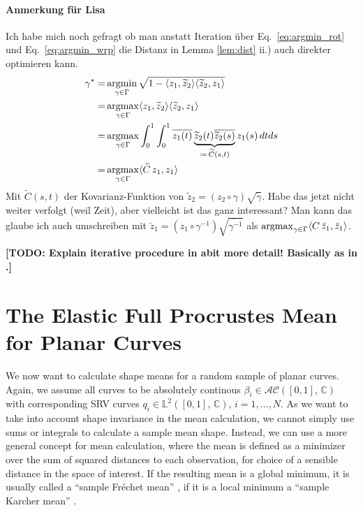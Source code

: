 \paragraph{Anmerkung für Lisa}
Ich habe mich noch gefragt ob man anstatt Iteration über Eq.\ \ref{eq:argmin_rot} und Eq.\ \ref{eq:argmin_wrp} die Distanz in Lemma \ref{lem:dist} ii.) auch direkter optimieren kann.
\begin{align*}
  \gamma^* = & \operatorname*{argmin}_{\gamma \in \Gamma} \sqrt{1 - \langle z_1, \widetilde z_2 \rangle \langle \widetilde z_2, z_1 \rangle } \\
    = & \operatorname*{argmax}_{\gamma \in \Gamma} \langle z_1, \widetilde z_2 \rangle \langle \widetilde z_2, z_1 \rangle \\
    = & \operatorname*{argmax}_{\gamma \in \Gamma} \int_0^1 \int_0^1
    \overline{z_1(t)} \underbrace{\widetilde z_2(t) \overline{\widetilde z_2(s)}}_{\coloneqq \, {\widetilde C}(s,t)} z_1(s) \, dt ds \\
    = & \operatorname*{argmax}_{\gamma \in \Gamma} \langle \widetilde C \, z_1, z_1 \rangle
\end{align*}
Mit $\widetilde C(s,t)$ der Kovarianz-Funktion von $\widetilde z_2 = (z_2 \circ \gamma) \sqrt{\dot\gamma}$.
Habe das jetzt nicht weiter verfolgt (weil Zeit), aber vielleicht ist das ganz interessant?
Man kann das glaube ich auch umschreiben mit $\breve z_1 = (z_1 \circ \gamma^{-1}) \sqrt{\dot{\gamma^{-1}}}$ als $\operatorname*{argmax}_{\gamma \in \Gamma} \langle C \, \breve z_1, \breve z_1 \rangle$.

\textbf{[TODO: Explain iterative procedure in abit more detail! Basically as in \cite{SrivastavaEtAl2011}.]}


\section{The Elastic Full Procrustes Mean for Planar Curves}
We now want to calculate shape means for a random sample of planar curves.
Again, we assume all curves to be absolutely continous $\beta_i \in \mathcal{AC}([0,1],\, \mathbb{C})$ with corresponding SRV curves $q_i \in \mathbb{L}^2([0,1],\, \mathbb{C})$, $i=1,\dots,N$.
As we want to take into account shape invariance in the mean calculation, we cannot simply use sums or integrals to calculate a sample mean shape.
Instead, we can use a more general concept for mean calculation, where the mean is defined as a minimizer over the sum of squared distances to each observation, for choice of a sensible distance in the space of interest.
If the resulting mean is a global minimum, it is usually called a \enquote{sample Fr\'echet mean} \parencite{Frechet1948}, if it is a local minimum a \enquote{sample Karcher mean} \parencite{Karcher1977} \parencite[see][111]{DrydenMardia2016}.

